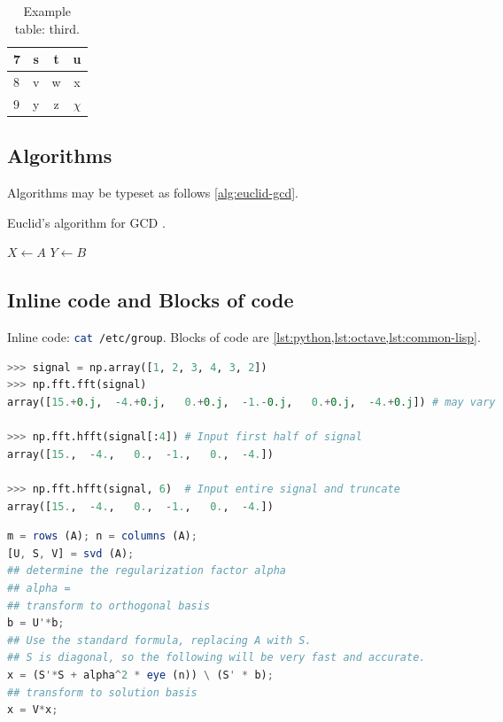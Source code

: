 \begin{table} \caption{\label{tab:example3} Example table: third.}
\begin{tabular}{l | c c c} \hline
7 & s & t & u \\ \hline
8 & v & w & x \\ \hline
9 & y & z & $\chi$ \\
\hline \end{tabular}
\end{table}

\subsection{Algorithms}
Algorithms may be typeset as follows \cref{alg:euclid-gcd}.

\begin{algorithm}
\caption{\label{alg:euclid-gcd} Euclid's algorithm for \gls{GCD}
\cite{enwiki:euclid-algorithm}.}

\BlankLine
$X \gets A$\;
$Y \gets B$\;
\end{algorithm}

\subsection{Inline code and Blocks of code}
Inline code: \lstinline[style=mystyle,language=sh]{cat /etc/group}. Blocks of code are
\cref{lst:python,lst:octave,lst:common-lisp}.

\begin{lstlisting}[language=Python,
                   caption={Python code sample \cite{numpy-hfft}.},
                   label={lst:python}]
>>> signal = np.array([1, 2, 3, 4, 3, 2])
>>> np.fft.fft(signal)
array([15.+0.j,  -4.+0.j,   0.+0.j,  -1.-0.j,   0.+0.j,  -4.+0.j]) # may vary

>>> np.fft.hfft(signal[:4]) # Input first half of signal
array([15.,  -4.,   0.,  -1.,   0.,  -4.])

>>> np.fft.hfft(signal, 6)  # Input entire signal and truncate
array([15.,  -4.,   0.,  -1.,   0.,  -4.])
\end{lstlisting}

\begin{lstlisting}[language=Octave,
                   caption={Octave code sample \cite{octave-example}.},
                   label={lst:octave}]
m = rows (A); n = columns (A);
[U, S, V] = svd (A);
## determine the regularization factor alpha
## alpha =
## transform to orthogonal basis
b = U'*b;
## Use the standard formula, replacing A with S.
## S is diagonal, so the following will be very fast and accurate.
x = (S'*S + alpha^2 * eye (n)) \ (S' * b);
## transform to solution basis
x = V*x;
\end{lstlisting}

